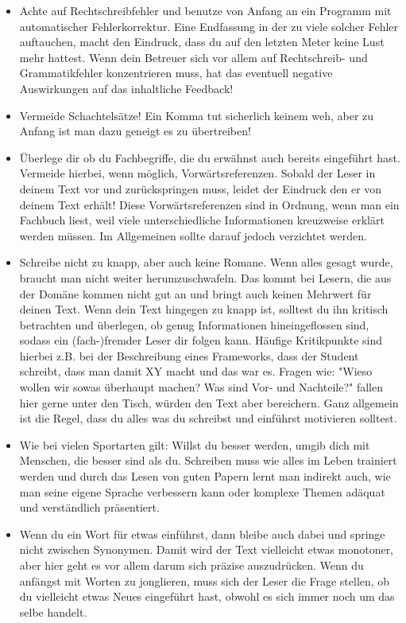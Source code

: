 \begin{itemize}
	\item	Achte auf Rechtschreibfehler und benutze von Anfang an ein Programm mit automatischer Fehlerkorrektur. Eine Endfassung in der zu viele solcher Fehler auftauchen, macht den Eindruck, dass du auf den letzten Meter keine Lust mehr hattest. Wenn dein Betreuer sich vor allem auf Rechtschreib- und Grammatikfehler konzentrieren muss, hat das eventuell negative Auswirkungen auf das inhaltliche Feedback!
	
	\item	Vermeide Schachtelsätze! Ein Komma tut sicherlich keinem weh, aber zu Anfang ist man dazu geneigt es zu übertreiben!
	
	\item	Überlege dir ob du Fachbegriffe, die du erwähnst auch bereits eingeführt hast. Vermeide hierbei, wenn möglich, Vorwärtsreferenzen. Sobald der Leser in deinem Text vor und zurückspringen muss, leidet der Eindruck den er von deinem Text erhält! Diese Vorwärtsreferenzen sind in Ordnung, wenn man ein Fachbuch liest, weil viele unterschiedliche Informationen kreuzweise erklärt werden müssen. Im Allgemeinen sollte darauf jedoch verzichtet werden.
	
	\item	Schreibe nicht zu knapp, aber auch keine Romane. Wenn alles gesagt wurde, braucht man nicht weiter herumzuschwafeln. Das kommt bei Lesern, die aus der Domäne kommen nicht gut an und bringt auch keinen Mehrwert für deinen Text. Wenn dein Text hingegen zu knapp ist, solltest du ihn kritisch betrachten und überlegen, ob genug Informationen hineingeflossen sind, sodass ein (fach-)fremder Leser dir folgen kann. Häufige Kritikpunkte sind hierbei z.B. bei der Beschreibung eines Frameworks, dass der Student schreibt, dass man damit XY macht und das war es. Fragen wie: "Wieso wollen wir sowas überhaupt machen? Was sind Vor- und Nachteile?"  fallen hier gerne unter den Tisch, würden den Text aber bereichern. Ganz allgemein ist die Regel, dass du alles was du schreibst und einführst motivieren solltest.
	
	\item Wie bei vielen Sportarten gilt: Willst du besser werden, umgib dich mit Menschen, die besser sind als du. Schreiben muss wie alles im Leben trainiert werden und durch das Lesen von guten Papern lernt man indirekt auch, wie man seine eigene Sprache verbessern kann oder komplexe Themen adäquat und verständlich präsentiert.
	
	\item Wenn du ein Wort für etwas einführst, dann bleibe auch dabei und springe nicht zwischen Synonymen. Damit wird der Text vielleicht etwas monotoner, aber hier geht es vor allem darum sich präzise auszudrücken. Wenn du anfängst mit Worten zu jonglieren, muss sich der Leser die Frage stellen, ob du vielleicht etwas Neues eingeführt hast, obwohl es sich immer noch um das selbe handelt.
	

\end{itemize}
